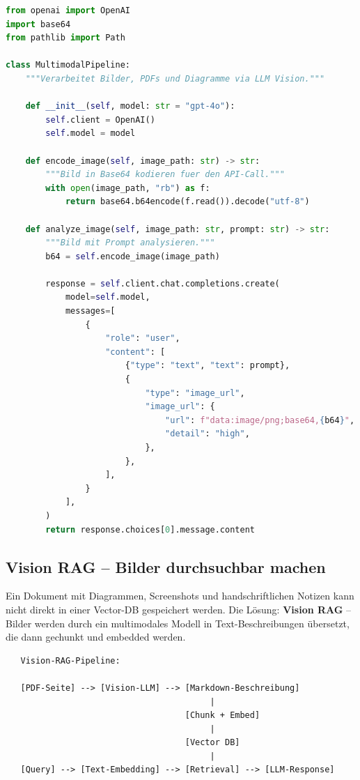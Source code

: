 \begin{lstlisting}[language=Python, caption=Multimodale Image-Input-Pipeline]
from openai import OpenAI
import base64
from pathlib import Path

class MultimodalPipeline:
    """Verarbeitet Bilder, PDFs und Diagramme via LLM Vision."""

    def __init__(self, model: str = "gpt-4o"):
        self.client = OpenAI()
        self.model = model

    def encode_image(self, image_path: str) -> str:
        """Bild in Base64 kodieren fuer den API-Call."""
        with open(image_path, "rb") as f:
            return base64.b64encode(f.read()).decode("utf-8")

    def analyze_image(self, image_path: str, prompt: str) -> str:
        """Bild mit Prompt analysieren."""
        b64 = self.encode_image(image_path)

        response = self.client.chat.completions.create(
            model=self.model,
            messages=[
                {
                    "role": "user",
                    "content": [
                        {"type": "text", "text": prompt},
                        {
                            "type": "image_url",
                            "image_url": {
                                "url": f"data:image/png;base64,{b64}",
                                "detail": "high",
                            },
                        },
                    ],
                }
            ],
        )
        return response.choices[0].message.content
\end{lstlisting}

\subsection{Vision RAG -- Bilder durchsuchbar machen}

Ein Dokument mit Diagrammen, Screenshots und handschriftlichen Notizen kann nicht direkt in einer Vector-DB gespeichert werden. Die Lösung: \textbf{Vision RAG} -- Bilder werden durch ein multimodales Modell in Text-Beschreibungen übersetzt, die dann gechunkt und embedded werden.

\begin{verbatim}
   Vision-RAG-Pipeline:

   [PDF-Seite] --> [Vision-LLM] --> [Markdown-Beschreibung]
                                         |
                                    [Chunk + Embed]
                                         |
                                    [Vector DB]
                                         |
   [Query] --> [Text-Embedding] --> [Retrieval] --> [LLM-Response]
\end{verbatim}

